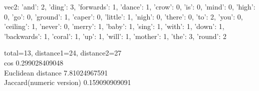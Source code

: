 \documentclass{article}
\begin{document}
vec2: {'and': 2, 'ding': 3, 'forwards': 1, 'dance': 1, 'crow': 0, 'is': 0, 'mind': 0, 'high': 0, 'go': 0, 'ground': 1, 'caper': 0, 'little': 1, 'nigh': 0, 'there': 0, 'to': 2, 'you': 0, 'ceiling': 1, 'never': 0, 'merry': 1, 'baby': 1, 'sing': 1, 'with': 1, 'down': 1, 'backwards': 1, 'coral': 1, 'up': 1, 'will': 1, 'mother': 1, 'the': 3, 'round': 2}

total=13, distance1=24, distance2=27 \\

cos 0.299028409048 \\

Euclidean distance 7.81024967591 \\

Jaccard(numeric version) 0.159090909091 \\
\end{document}
